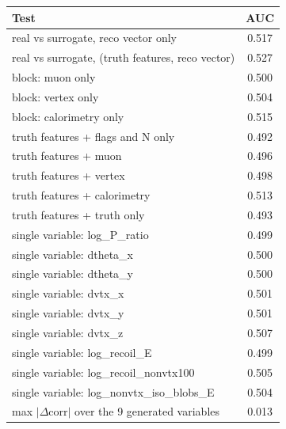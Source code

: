\begin{tabular}{lc}
\toprule
Test & AUC \\
\midrule
real vs surrogate, reco vector only & 0.517 \\
real vs surrogate, (truth features, reco vector) & 0.527 \\
\midrule
block: muon only & 0.500 \\
block: vertex only & 0.504 \\
block: calorimetry only & 0.515 \\
truth features + flags and N only & 0.492 \\
truth features + muon & 0.496 \\
truth features + vertex & 0.498 \\
truth features + calorimetry & 0.513 \\
truth features + truth only & 0.493 \\
single variable: log\_P\_ratio & 0.499 \\
single variable: dtheta\_x & 0.500 \\
single variable: dtheta\_y & 0.500 \\
single variable: dvtx\_x & 0.501 \\
single variable: dvtx\_y & 0.501 \\
single variable: dvtx\_z & 0.507 \\
single variable: log\_recoil\_E & 0.499 \\
single variable: log\_recoil\_nonvtx100 & 0.505 \\
single variable: log\_nonvtx\_iso\_blobs\_E & 0.504 \\
\midrule
max $|\Delta$corr$|$ over the 9 generated variables & 0.013 \\
\bottomrule
\end{tabular}
